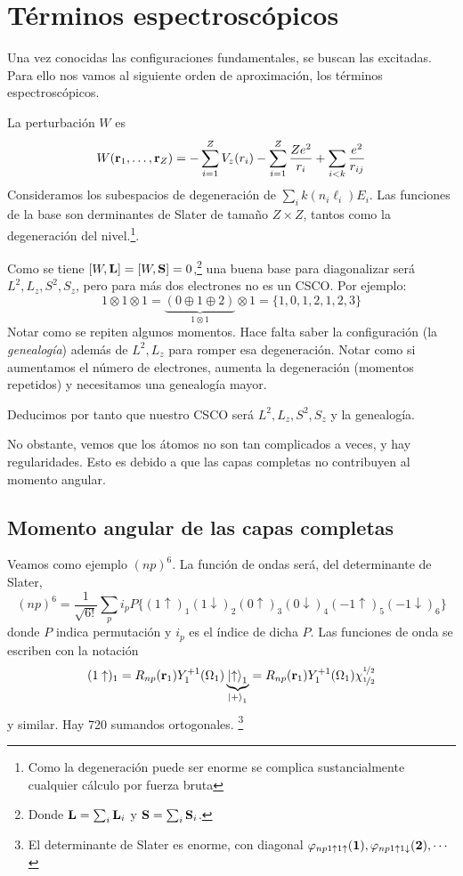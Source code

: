 \section{Términos espectroscópicos}
Una vez conocidas las configuraciones fundamentales, se buscan las
excitadas. Para ello nos vamos al siguiente orden de aproximación, los términos
espectroscópicos.

La perturbación $W$ es
\begin{equation}
  W(\bm{\mathrm{r}}_1,\ldots,\bm{\mathrm{r}}_Z) = - \sum_{i=1}^Z V_z(r_i)-
  \sum_{i=1}^Z \frac{Ze^2}{r_i} + \sum_{i<k} \frac{e^2}{r_{ij}}
\end{equation}
Consideramos los subespacios de degeneración de $\sum_{i}
k(n_i\ell_i)E_i$. Las funciones de la base son derminantes de Slater de tamaño
$Z\times Z$, tantos como la
  degeneración del nivel.\footnote{Como la degeneración puede ser enorme
  se complica sustancialmente cualquier cálculo por fuerza bruta}.

Como se tiene $[W,\bm{\mathrm{L}}]=[W,\bm{\mathrm{S}}]=0$,\footnote{Donde $\bm{\mathrm{L}} = \sum_{i} \bm{\mathrm{L}}_i$ y $\bm{\mathrm{S}} = \sum_{i} \bm{\mathrm{S}}_i$.}
una buena base para diagonalizar será $L^2,L_z,S^2,S_z$, pero para
más dos electrones no es un CSCO. Por ejemplo:
\begin{equation}
  1 \otimes 1 \otimes 1 = \underbrace{(0 \oplus 1 \oplus 2)}_{1\otimes
  1} \otimes 1 = \{1,0,1,2,1,2,3\}
\end{equation}
Notar como se repiten algunos momentos. Hace falta saber la
configuración (la \emph{genealogía}) además de $L^2,L_z$ para romper esa degeneración. Notar como
si aumentamos el número de electrones, aumenta la degeneración
(momentos repetidos) y necesitamos una genealogía mayor.

Deducimos por tanto que nuestro CSCO será $L^2,L_z,S^2,S_z$ y la
genealogía.

No obstante, vemos que los átomos no son tan complicados a veces, y
hay regularidades. Esto es debido a que las capas completas no
contribuyen al momento angular.

\subsection{Momento angular de las capas completas}
Veamos como ejemplo $(np)^6$. La función de ondas será, del
determinante de Slater,
\begin{equation}
(np)^6 = \frac{1}{\sqrt{6!}} \sum_{p} i_p P\{(1\uparrow)_1(1\downarrow)_2(0\uparrow)_3(0\downarrow)_4(-1\uparrow)_5(-1\downarrow)_6\}
\end{equation} 
donde $P$ indica permutación y $i_p$ es el índice de dicha $P$. Las
funciones de onda se escriben con la notación
\begin{equation}
  (1\uparrow)_1 = R_{np}(\bm{\mathrm{r}}_1) Y_1^{+1}(\Omega_1)
  \underbrace{\ket{\uparrow}_1}_{\ket{+}_1} = R_{np}(\bm{\mathrm{r}}_1) Y_1^{+1}(\Omega_1) \chi_{{\nicefrac{1}{2}}}^{{\nicefrac{1}{2}}}
\end{equation}
y similar.
Hay 720 sumandos ortogonales.
\footnote{El determinante de Slater es enorme, con diagonal
  $\varphi_{np 1\uparrow 1\uparrow}(\bm{\mathrm{1}}), \varphi_{np
1\uparrow1\downarrow}(\bm{\mathrm{2}}), \cdots$}

